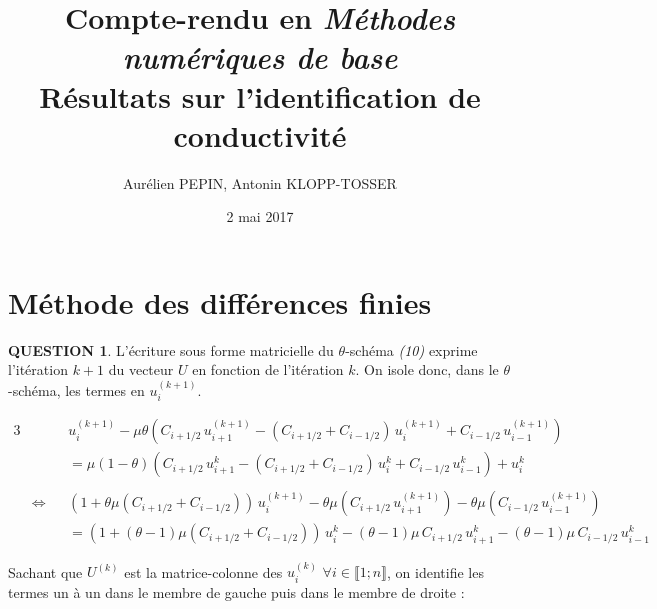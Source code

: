 \documentclass[a4paper,11pt]{article}
\title{Compte-rendu en \textit{Méthodes numériques de base} \\
\textbf{Résultats sur l'identification de conductivité}}
\author{Aurélien PEPIN, Antonin KLOPP-TOSSER}
\date{2 mai 2017}
\newcommand{\quest}[1]{\small\textbf{#1}\normalsize}
\theoremstyle{nonumberplain}
\theoremstyle{nonumberplain}
\theoremstyle{nonumberplain}
\begin{document}
\maketitle

\section{Méthode des différences finies}

    \quest{QUESTION 1}. L'écriture sous forme matricielle du $\theta$-schéma \textit{(10)} exprime l'itération $k + 1$ du vecteur $U$ en fonction de l'itération $k$.
    On isole donc, dans le $\theta$-schéma, les termes en $u_{i}^{(k + 1)}$.

    \begin{calculs}
        \begin{alignat*}{3}
            & & & u_{i}^{(k + 1)} - \mu\theta\left(C_{i + 1/2}\,u_{i + 1}^{(k + 1)} - (C_{i + 1/2} + C_{i - 1/2})\,u_{i}^{(k + 1)} + C_{i - 1/2}\,u_{i - 1}^{(k + 1)}\right) \\
            & & & = \mu(1 - \theta)\left(C_{i + 1/2}\,u_{i + 1}^{k} - (C_{i + 1/2} + C_{i - 1/2})\,u_{i}^{k} + C_{i - 1/2}\,u_{i - 1}^{k}\right) + u_{i}^{k} \\
            & & & \\
            & \iff & & \left(1+\theta\mu(C_{i + 1/2} + C_{i - 1/2})\right)\,u_{i}^{(k + 1)} - \theta\mu(C_{i + 1/2}\,u_{i + 1}^{(k + 1)}) - \theta\mu(C_{i - 1/2}\,u_{i - 1}^{(k + 1)}) \\
            & & & = \left(1 + (\theta - 1)\mu(C_{i + 1/2} + C_{i - 1/2})\right)\,u_{i}^{k} - (\theta - 1)\mu\,C_{i + 1/2}\,u_{i + 1}^{k} - (\theta - 1)\mu\,C_{i - 1/2}\,u_{i - 1}^{k}
        \end{alignat*}
    \end{calculs}

    \medskip
    Sachant que $U^{(k)}$ est la matrice-colonne des $u_{i}^{(k)}$ $\forall i \in \llbracket 1; n \rrbracket$, on identifie
    les termes un à un dans le membre de gauche puis dans le membre de droite :
\end{document}
